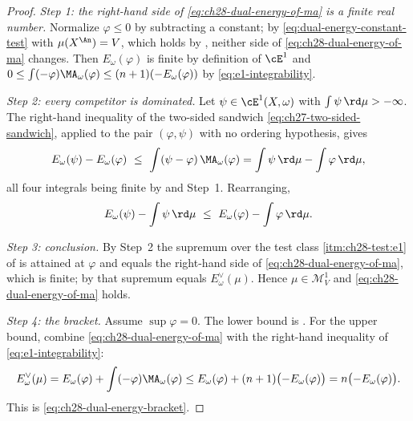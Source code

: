 \begin{proof}
\emph{Step 1: the right-hand side of \eqref{eq:ch28-dual-energy-of-ma} is a
finite real number.}  Normalize $\varphi\leq0$ by subtracting a constant;
by \eqref{eq:dual-energy-constant-test} with $\mu(X^{\An})=V$, which holds
by , neither side of
\eqref{eq:ch28-dual-energy-of-ma} changes.  Then $E_\omega(\varphi)$ is
finite by definition of $\cE^1$ and
$0\leq\int(-\varphi)\MA_\omega(\varphi)\leq(n+1)(-E_\omega(\varphi))$ by
\eqref{eq:e1-integrability}.

\emph{Step 2: every competitor is dominated.}  Let
$\psi\in\cE^1(X,\omega)$ with $\int\psi\,\rd\mu>-\infty$.  The
right-hand inequality of the two-sided sandwich
\eqref{eq:ch27-two-sided-sandwich}, applied to the pair
$(\varphi,\psi)$ with no ordering hypothesis, gives
\[
 E_\omega(\psi)-E_\omega(\varphi)
 \ \leq\ \int(\psi-\varphi)\,\MA_\omega(\varphi)
 =\int\psi\,\rd\mu-\int\varphi\,\rd\mu ,
\]
all four integrals being finite by
 and Step~1.  Rearranging,
\[
 E_\omega(\psi)-\int\psi\,\rd\mu
 \ \leq\ E_\omega(\varphi)-\int\varphi\,\rd\mu .
\]

\emph{Step 3: conclusion.}  By Step~2 the supremum over the test class
\cref{itm:ch28-test:e1} of  is attained at
$\varphi$ and equals the right-hand side of
\eqref{eq:ch28-dual-energy-of-ma}, which is finite; by
 that supremum equals $E^\vee_\omega(\mu)$.
Hence $\mu\in\mathcal M^1_V$ and \eqref{eq:ch28-dual-energy-of-ma} holds.

\emph{Step 4: the bracket.}  Assume $\sup\varphi=0$.  The lower bound is
.  For the upper bound, combine
\eqref{eq:ch28-dual-energy-of-ma} with the right-hand inequality of
\eqref{eq:e1-integrability}:
\[
 E^\vee_\omega(\mu)
 =E_\omega(\varphi)+\int(-\varphi)\MA_\omega(\varphi)
 \leq E_\omega(\varphi)+(n+1)\bigl(-E_\omega(\varphi)\bigr)
 =n\bigl(-E_\omega(\varphi)\bigr).
\]
This is \eqref{eq:ch28-dual-energy-bracket}.
\end{proof}

